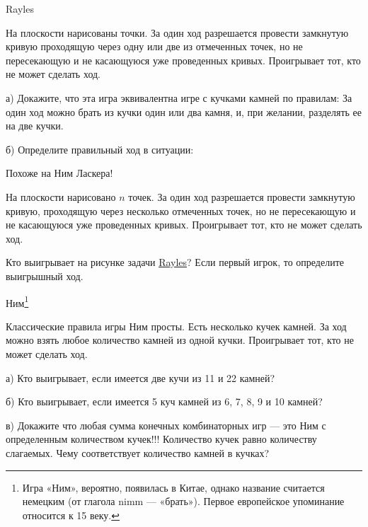 \begin{problem}
 Rayles\par
{} \label{Rayles}
На плоскости нарисованы точки. За один ход разрешается провести замкнутую кривую проходящую через одну или две из отмеченных точек, но не пересекающую и не касающуюся уже проведенных кривых. Проигрывает тот, кто не может сделать ход.\par
а)	Докажите, что эта игра эквивалентна игре с кучками камней по правилам: За один ход можно брать из кучки один или два камня, и, при желании, разделять ее на две кучки.\par
б)	Определите правильный ход в ситуации:\par


\begin{sol}

\end{sol}
\end{problem}



\begin{problem}
 Похоже на Ним Ласкера!\par
На плоскости нарисовано  $n$  точек. За один ход разрешается провести замкнутую кривую, проходящую через несколько отмеченных точек, но не пересекающую и не касающуюся уже проведенных кривых. Проигрывает тот, кто не может сделать ход.\par
Кто выигрывает на рисунке задачи \hyperref[Rayles]{Rayles}? Если первый игрок, то определите выигрышный ход.



\begin{sol}

\end{sol}
\end{problem}




\begin{problem}
 Ним\footnote{Игра «Ним», вероятно, появилась в Китае, однако название считается немецким (от глагола nimm — «брать»). Первое европейское упоминание относится к 15 веку.} \par
Классические правила игры Ним просты. Есть несколько кучек камней. За ход можно взять любое количество камней из одной кучки. Проигрывает тот, кто не может сделать ход.\par
а)	Кто выигрывает, если имеется две кучи из 11 и 22 камней?\par
б)	Кто выигрывает, если имеется 5 куч камней из 6, 7, 8, 9 и 10 камней?\par
в)	Докажите что любая сумма конечных комбинаторных игр — это Ним с определенным количеством кучек!!! Количество кучек равно количеству слагаемых. Чему соответствует количество камней в кучках?



\begin{sol}

\end{sol}
\end{problem}



